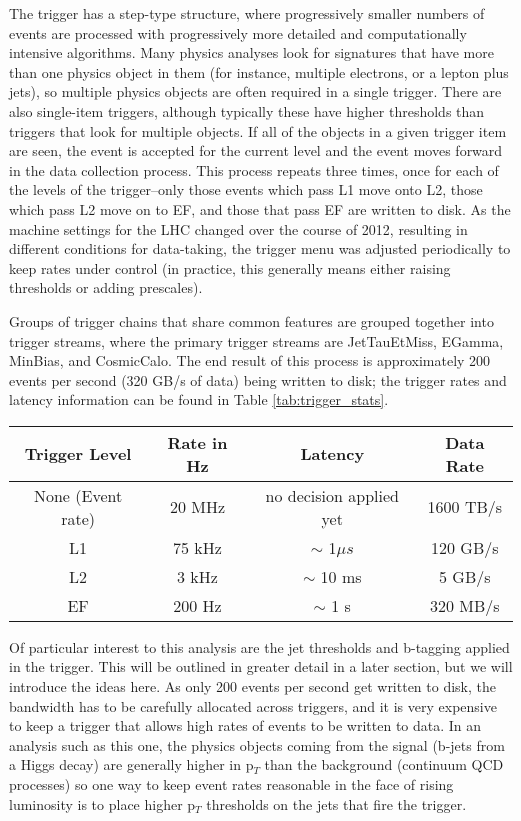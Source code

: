 The trigger has a step-type structure, where progressively smaller numbers of events are processed with progressively more detailed and computationally intensive algorithms.  Many physics analyses look for signatures that have more than one physics object in them (for instance, multiple electrons, or a lepton plus jets), so multiple physics objects are often required in a single trigger.  There are also single-item triggers, although typically these have higher thresholds than triggers that look for multiple objects.  If all of the objects in a given trigger item are seen, the event is accepted for the current level and the event moves forward in the data collection process.  This process repeats three times, once for each of the levels of the trigger--only those events which pass L1 move onto L2, those which pass L2 move on to EF, and those that pass EF are written to disk.   As the machine settings for the LHC changed over the course of 2012, resulting in different conditions for data-taking, the trigger menu was adjusted periodically to keep rates under control (in practice, this generally means either raising thresholds or adding prescales).  


Groups of trigger chains that share common features are grouped together into trigger streams, where the primary trigger streams are JetTauEtMiss, EGamma, MinBias, and CosmicCalo.  The end result of this process is approximately 200 events per second (320 GB/s of data) being written to disk; the trigger rates and latency information can be found in Table \ref{tab:trigger_stats}.

  

\begin{table}
\begin{tabular}{c | c | c | c}
Trigger Level & Rate in Hz  & Latency  & Data Rate\\  \hline
None (Event rate) & 20 MHz  & no decision applied yet & 1600 TB/s \\
L1  & 75 kHz  &  $\sim$ 1$\mu s$  & 120 GB/s\\
L2  & 3 kHz    & $\sim$ 10 ms & 5 GB/s \\
EF  &  200 Hz  & $\sim$ 1 s & 320 MB/s \\
\end{tabular}
\end{table}
\label{tab:trigger_stats}


Of particular interest to this analysis are the jet thresholds and b-tagging applied in the trigger.  This will be outlined in greater detail in a later section, but we will introduce the ideas here.  As only 200 events per second get written to disk, the bandwidth has to be carefully allocated across triggers, and it is very expensive to keep a trigger that allows high rates of events to be written to data.  In an analysis such as this one, the physics objects coming from the signal (b-jets from a Higgs decay) are generally higher in p$_T$ than the background (continuum QCD processes) so one way to keep event rates reasonable in the face of rising luminosity is to place higher p$_T$ thresholds on the jets that fire the trigger.   

